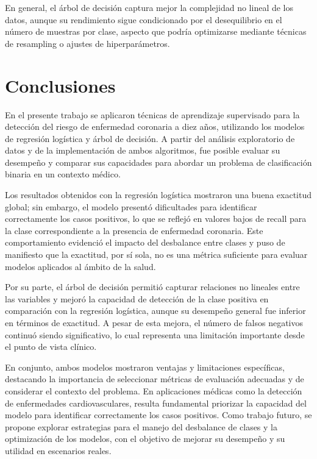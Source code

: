 \documentclass{article}
\begin{document}
        En general, el árbol de decisión captura mejor la complejidad no lineal de los datos, aunque su rendimiento sigue condicionado por el desequilibrio en el número de muestras por clase, aspecto que podría optimizarse mediante técnicas de resampling o ajustes de hiperparámetros. 

\newpage
\section{Conclusiones}

En el presente trabajo se aplicaron técnicas de aprendizaje supervisado para la detección del riesgo de enfermedad coronaria a diez años, utilizando los modelos de regresión logística y árbol de decisión. A partir del análisis exploratorio de datos y de la implementación de ambos algoritmos, fue posible evaluar su desempeño y comparar sus capacidades para abordar un problema de clasificación binaria en un contexto médico.

Los resultados obtenidos con la regresión logística mostraron una buena exactitud global; sin embargo, el modelo presentó dificultades para identificar correctamente los casos positivos, lo que se reflejó en valores bajos de recall para la clase correspondiente a la presencia de enfermedad coronaria. Este comportamiento evidenció el impacto del desbalance entre clases y puso de manifiesto que la exactitud, por sí sola, no es una métrica suficiente para evaluar modelos aplicados al ámbito de la salud.

Por su parte, el árbol de decisión permitió capturar relaciones no lineales entre las variables y mejoró la capacidad de detección de la clase positiva en comparación con la regresión logística, aunque su desempeño general fue inferior en términos de exactitud. A pesar de esta mejora, el número de falsos negativos continuó siendo significativo, lo cual representa una limitación importante desde el punto de vista clínico.

En conjunto, ambos modelos mostraron ventajas y limitaciones específicas, destacando la importancia de seleccionar métricas de evaluación adecuadas y de considerar el contexto del problema. En aplicaciones médicas como la detección de enfermedades cardiovasculares, resulta fundamental priorizar la capacidad del modelo para identificar correctamente los casos positivos. Como trabajo futuro, se propone explorar estrategias para el manejo del desbalance de clases y la optimización de los modelos, con el objetivo de mejorar su desempeño y su utilidad en escenarios reales.
\end{document}
